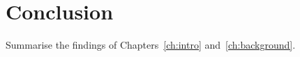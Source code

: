 \chapter{Conclusion}\label{ch:conclusion}
Summarise the findings of Chapters~\ref{ch:intro} and~\ref{ch:background}.
